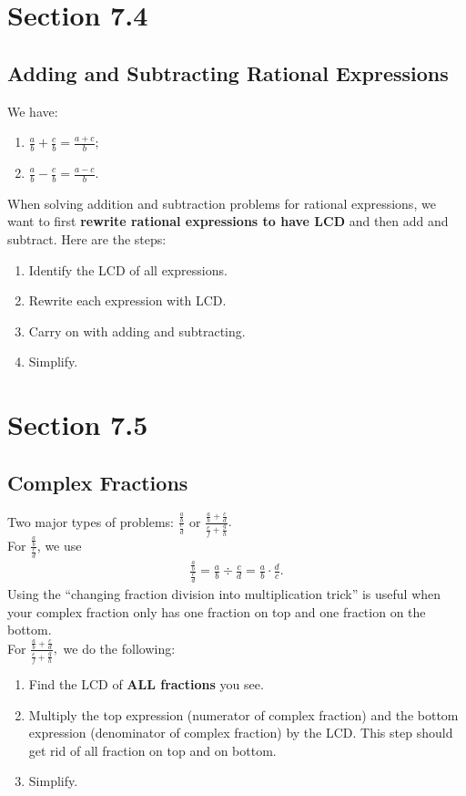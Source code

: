 \documentclass[11pt]{article}
\theoremstyle{plain}
\theoremstyle{definition}
\theoremstyle{remark}
\begin{document}
\section{Section 7.4}
\subsection{Adding and Subtracting Rational Expressions}
We have: 
\begin{enumerate}[1)]
\item $\frac{a}{b}+\frac{c}{b}=\frac{a+c}{b};   $
\item $\frac{a}{b}-\frac{c}{b}=\frac{a-c}{b}.$
\end{enumerate}
When solving addition and subtraction problems for rational expressions, we want to first \textbf{rewrite rational expressions to have LCD} and then add and subtract. Here are the steps: 
\begin{enumerate}[1)]
\item Identify the LCD of all expressions. 
\item Rewrite each expression with LCD. 
\item Carry on with adding and subtracting. 
\item Simplify.
\end{enumerate}
\section{Section 7.5}
\subsection{Complex Fractions}
Two major types of problems: $\frac{\frac{a}{b} }{\frac{c}{d} } $ or $\frac{\frac{a}{b}+\frac{c}{d}  }{\frac{e}{f}+\frac{g}{h}  }.$ \\ 

\noindent For $\frac{\frac{a}{b} }{\frac{c}{d} } $, we use 
\begin{align*}
\frac{\frac{a}{b} }{\frac{c}{d} }=\frac{a}{b}\div \frac{c}{d}=\frac{a}{b}\cdot \frac{d}{c}.     
\end{align*}
Using the ``changing fraction division into multiplication trick'' is useful when your complex fraction only has one fraction on top and one fraction on the bottom.\\ 

\noindent For $\frac{\frac{a}{b}+\frac{c}{d}  }{\frac{e}{f}+\frac{g}{h}  },$ we do the following: 
\begin{enumerate}[1)]
\item Find the LCD of \textbf{ALL fractions} you see. 
\item Multiply the top expression (numerator of complex fraction) and the bottom expression (denominator of complex fraction) by the LCD. This step should get rid of all fraction on top and on bottom. 
\item Simplify. 
\end{enumerate}
\end{document}
